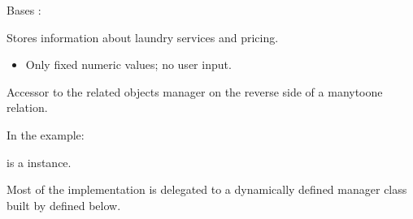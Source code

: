 \documentclass[letterpaper,10pt,french]{sphinxmanual}
\begin{document}
\begin{fulllineitems}
\label{\detokenize{index:core.models.LaundryInfo}}
\pysigstartsignatures
\pysiglinewithargsret
{}
{\sphinxparamcomma {}}
{}
\pysigstopsignatures
\sphinxAtStartPar
Bases : 

\sphinxAtStartPar
Stores information about laundry services and pricing.
\begin{description}
\begin{itemize}
\item {} 
\sphinxAtStartPar
Only fixed numeric values; no user input.

\end{itemize}

\end{description}

\begin{fulllineitems}
\label{\detokenize{index:core.models.LaundryInfo.translations}}
\pysigstartsignatures
\pysigline
{}
\pysigstopsignatures
\sphinxAtStartPar
Accessor to the related objects manager on the reverse side of a
many\sphinxhyphen{}to\sphinxhyphen{}one relation.

\sphinxAtStartPar
In the example:

\begin{sphinxVerbatim}[commandchars=\\\{\}]
       
\end{sphinxVerbatim}

\sphinxAtStartPar
{} is a  instance.

\sphinxAtStartPar
Most of the implementation is delegated to a dynamically defined manager
class built by  defined below.


\end{fulllineitems}
\end{fulllineitems}
\end{document}
